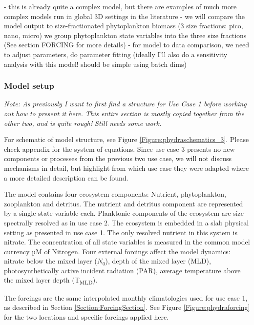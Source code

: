 \documentclass[journal abbreviations, manuscript]{copernicus}
\begin{document}
- this is already quite a complex model, but there are examples of much more complex models run in global 3D settings in the literature \citep{Ward2012}
- we will compare the model output to size-fractionated phytoplankton biomass (3 size fractions: pico, nano, micro) we group phytoplankton state variables into the three size fractions (See section FORCING for more details)
- for model to data comparison, we need to adjust parameters, do parameter fitting (ideally I'll also do a sensitivity analysis with this model! should be simple using batch dims)

\subsubsection{Model setup}

\textit{Note: As previously I want to first find a structure for Use Case 1 before working out how to present it here. This entire section is mostly copied together from the other two, and is quite rough! Still needs some work. }

For schematic of model structure, see Figure \ref{Figure:phydraschematics_3}. Please check appendix for the system of equations. 
Since use case 3 presents no new components or processes from the previous two use case, we will not discuss mechanisms in detail, but highlight from which use case they were adapted where a more detailed description can be found. 

The model contains four ecosystem components: Nutrient, phytoplankton, zooplankton and detritus. The nutrient and detritus component are represented by a single state variable each. Planktonic components of the ecosystem are size-spectrally resolved as in use case 2.
The ecosystem is embedded in a slab physical setting as presented in use case 1. The only resolved nutrient in this system is nitrate. The concentration of all state variables is measured in the common model currency \unit{µM} of Nitrogen. Four external forcings affect the model dynamics: nitrate below the mixed layer ($N_0$), depth of the mixed layer (MLD), photosynthetically active incident radiation (PAR), average temperature above the mixed layer depth (\unit{T_{MLD}}). 

The forcings are the same interpolated monthly climatologies used for use case 1, as described in Section \ref{Section:ForcingSection}. See Figure \ref{Figure:phydraforcing} for the two locations and specific forcings applied here.
\end{document}
